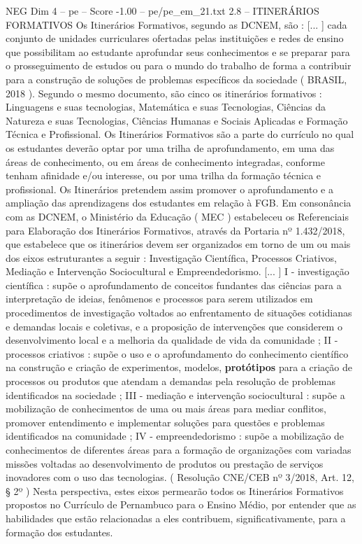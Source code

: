 \begin{textsample}{NEG Dim 4 – pe – Score -1.00 – pe/pe\_em\_21.txt}  \label{ex:f4_neg_018}
2.8 – ITINERÁRIOS FORMATIVOS Os Itinerários Formativos, segundo as DCNEM, são : [... ] cada conjunto de unidades curriculares ofertadas pelas instituições e redes de ensino que possibilitam ao estudante aprofundar seus conhecimentos e se preparar para o prosseguimento de estudos ou para o mundo do trabalho de forma a contribuir para a construção de soluções de problemas específicos da sociedade ( BRASIL, 2018 ).
Segundo o mesmo documento, são cinco os itinerários formativos : Linguagens e suas tecnologias, Matemática e suas Tecnologias, Ciências da Natureza e suas Tecnologias, Ciências Humanas e Sociais Aplicadas e Formação Técnica e Profissional.
Os Itinerários Formativos são a parte do currículo no qual os estudantes deverão optar por uma trilha de aprofundamento, em uma das áreas de conhecimento, ou em áreas de conhecimento integradas, conforme tenham afinidade e/ou interesse, ou por uma trilha da formação técnica e profissional.
Os Itinerários pretendem assim promover o aprofundamento e a ampliação das aprendizagens dos estudantes em relação à FGB.
Em consonância com as DCNEM, o Ministério da Educação ( MEC ) estabeleceu os Referenciais para Elaboração dos Itinerários Formativos, através da Portaria nº 1.432/2018, que estabelece que os itinerários devem ser organizados em torno de um ou mais dos eixos estruturantes a seguir : Investigação Científica, Processos Criativos, Mediação e Intervenção Sociocultural e Empreendedorismo. [... ] I - investigação científica : supõe o aprofundamento de conceitos fundantes das ciências para a interpretação de ideias, fenômenos e processos para serem utilizados em procedimentos de investigação voltados ao enfrentamento de situações cotidianas e demandas locais e coletivas, e a proposição de intervenções que considerem o desenvolvimento local e a melhoria da qualidade de vida da comunidade ; II - processos criativos : supõe o uso e o aprofundamento do conhecimento científico na construção e criação de experimentos, modelos, \textbf{protótipos} para a criação de processos ou produtos que atendam a demandas pela resolução de problemas identificados na sociedade ; III - mediação e intervenção sociocultural : supõe a mobilização de conhecimentos de uma ou mais áreas para mediar conflitos, promover entendimento e implementar soluções para questões e problemas identificados na comunidade ; IV - empreendedorismo : supõe a mobilização de conhecimentos de diferentes áreas para a formação de organizações com variadas missões voltadas ao desenvolvimento de produtos ou prestação de serviços inovadores com o uso das tecnologias. ( Resolução CNE/CEB nº 3/2018, Art. 12, § 2º ) Nesta perspectiva, estes eixos permearão todos os Itinerários Formativos propostos no Currículo de Pernambuco para o Ensino Médio, por entender que as habilidades que estão relacionadas a eles contribuem, significativamente, para a formação dos estudantes.

\end{textsample}
